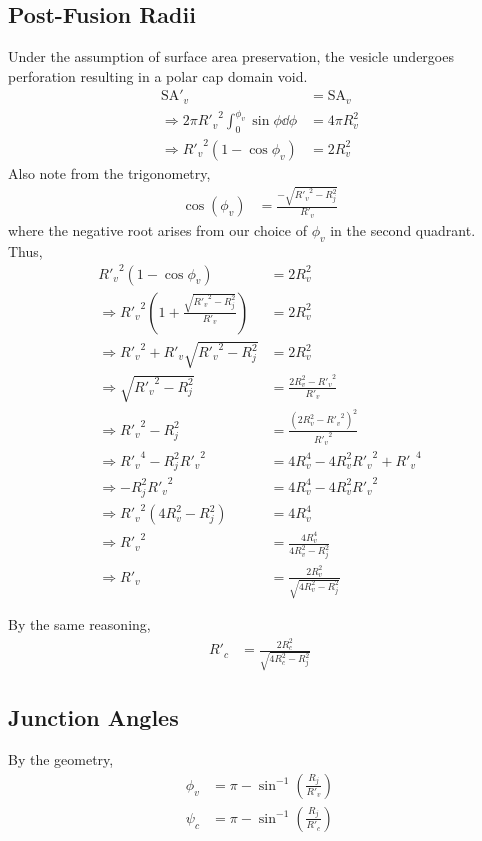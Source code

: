 \documentclass{report}
\newcommand\Par[1]{{ \left({#1}\right) }}
\newcommand\Rc{{ R'_c }}
\newcommand\Rv{{ R'_v }}
\newcommand\SA{{ \text{SA} }}
\begin{document}
\subsection{Post-Fusion Radii}
Under the assumption of surface area preservation, the vesicle undergoes perforation resulting in a polar cap domain void.
\begin{align*}
	\SA'_v &= \SA_v \\
	\Rightarrow 2\pi \Rv^2 \int_0^{\phi_v} \sin\phi \dd{\phi} &= 4\pi R_v^2 \\
	\Rightarrow \Rv^2 \Par{1 - \cos\phi_v} &= 2 R_v^2
\end{align*}
Also note from the trigonometry,
\begin{align*}
	\cos(\phi_v) &= \frac{-\sqrt{\Rv^2 - R_j^2}}{\Rv}
\end{align*}
where the negative root arises from our choice of $\phi_v$ in the second quadrant. Thus,
\begin{align*}
	\Rv^2 \Par{1 - \cos\phi_v} &= 2 R_v^2 \\
	\Rightarrow \Rv^2 \Par{1 + \frac{\sqrt{\Rv^2 - R_j^2}}{\Rv}} &= 2 R_v^2 \\
	\Rightarrow \Rv^2 + \Rv\sqrt{\Rv^2 - R_j^2} &= 2 R_v^2 \\
	\Rightarrow \sqrt{\Rv^2 - R_j^2} &= \frac{2 R_v^2 - \Rv^2}{\Rv} \\
	\Rightarrow \Rv^2 - R_j^2 &= \frac{\Par{2 R_v^2 - \Rv^2}^2}{\Rv^2} \\
	\Rightarrow \Rv^4 - R_j^2 \Rv^2 &= 4R_v^4 - 4R_v^2\Rv^2 + \Rv^4 \\
	\Rightarrow -R_j^2 \Rv^2 &= 4R_v^4 - 4R_v^2\Rv^2 \\
	\Rightarrow \Rv^2\Par{4R_v^2 - R_j^2} &= 4R_v^4 \\
	\Rightarrow \Rv^2 &= \frac{4R_v^4}{4R_v^2 - R_j^2} \\
	\Rightarrow \Rv &= \frac{2R_v^2}{\sqrt{4R_v^2 - R_j^2}}
\end{align*}

By the same reasoning,
\begin{align*}
	\Rc &= \frac{2R_c^2}{\sqrt{4R_c^2 - R_j^2}}
\end{align*}

\subsection{Junction Angles}
By the geometry,
\begin{align*}
	\phi_v &= \pi - \sin^{-1}\Par{\frac{R_j}{\Rv}} \\
	\psi_c &= \pi - \sin^{-1}\Par{\frac{R_j}{\Rc}}
\end{align*}
\end{document}
